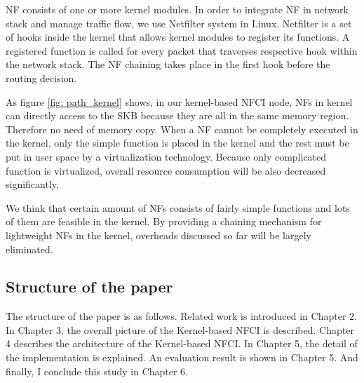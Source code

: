 NF consists of one or more kernel modules. In order to integrate NF in network stack and manage traffic flow, we use Netfilter system in Linux. Netfilter is a set of hooks inside the kernel that allows kernel modules to register its functions. A registered function is called for every packet that traverses respective hook within the network stack. The NF chaining takes place in the first hook before the routing decision. 

As figure \ref{fig: path_kernel} shows, in our kernel-based NFCI node, NFs in kernel can directly access to the SKB because they are all in the same memory region. Therefore no need of memory copy. When a NF cannot be completely executed in the kernel, only the simple function is placed in the kernel and the rest must be put in user space by a virtualization technology. Because only complicated function is virtualized, overall resource consumption will be also decreased significantly. 

We think that certain amount of NFs consists of fairly simple functions and lots of them are feasible in the kernel. By providing a chaining mechanism for lightweight NFs in the kernel, overheads discussed so far will be largely eliminated. 

\subsection{Structure of the paper}
The structure of the paper is as follows. Related work is introduced in Chapter 2. In Chapter 3, the overall picture of the Kernel-based NFCI is described. Chapter 4 describes the architecture of the Kernel-based NFCI. In Chapter 5, the detail of the implementation is explained. An evaluation result is shown in Chapter 5. And finally, I conclude this study in Chapter 6. 











